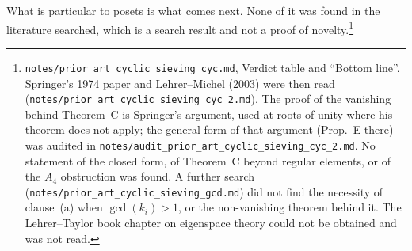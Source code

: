 \documentclass[11pt]{article}
\theoremstyle{definition}
\theoremstyle{remark}
\newcommand{\src}[1]{\nolinkurl{#1}}
\begin{document}
What is particular to posets is what comes next. None of it was found in the
literature searched, which is a search result and not a proof of
novelty.\footnote{\src{notes/prior_art_cyclic_sieving_cyc.md}, Verdict
table and ``Bottom line''. Springer's 1974 paper and Lehrer--Michel (2003)
were then read (\src{notes/prior_art_cyclic_sieving_cyc_2.md}). The proof
of the vanishing behind Theorem~C is Springer's argument, used at roots of
unity where his theorem does not apply; the general form of that argument
(Prop.~E there) was audited in
\src{notes/audit_prior_art_cyclic_sieving_cyc_2.md}. No statement of the
closed form, of Theorem~C beyond regular elements, or of the $A_4$
obstruction was found. A further search
(\src{notes/prior_art_cyclic_sieving_gcd.md}) did not find the necessity
of clause~(a) when $\gcd(k_i)>1$, or the non-vanishing theorem behind it. The Lehrer--Taylor book chapter on eigenspace theory
could not be obtained and was not read.}
\end{document}
